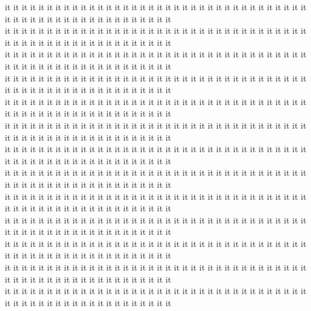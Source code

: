 it it it it it it it it it it it it it it it it it it it it it it it it it it it it it it it it it it it it it it it it it it it it it it it it it it it it it it it it\\
it it it it it it it it it it it it it it it it it it it it it it it it it it it it it it it it it it it it it it it it it it it it it it it it it it it it it it it it\\
it it it it it it it it it it it it it it it it it it it it it it it it it it it it it it it it it it it it it it it it it it it it it it it it it it it it it it it it\\
it it it it it it it it it it it it it it it it it it it it it it it it it it it it it it it it it it it it it it it it it it it it it it it it it it it it it it it it\\
it it it it it it it it it it it it it it it it it it it it it it it it it it it it it it it it it it it it it it it it it it it it it it it it it it it it it it it it\\
it it it it it it it it it it it it it it it it it it it it it it it it it it it it it it it it it it it it it it it it it it it it it it it it it it it it it it it it\\
it it it it it it it it it it it it it it it it it it it it it it it it it it it it it it it it it it it it it it it it it it it it it it it it it it it it it it it it\\
it it it it it it it it it it it it it it it it it it it it it it it it it it it it it it it it it it it it it it it it it it it it it it it it it it it it it it it it\\
it it it it it it it it it it it it it it it it it it it it it it it it it it it it it it it it it it it it it it it it it it it it it it it it it it it it it it it it\\
it it it it it it it it it it it it it it it it it it it it it it it it it it it it it it it it it it it it it it it it it it it it it it it it it it it it it it it it\\
it it it it it it it it it it it it it it it it it it it it it it it it it it it it it it it it it it it it it it it it it it it it it it it it it it it it it it it it\\
it it it it it it it it it it it it it it it it it it it it it it it it it it it it it it it it it it it it it it it it it it it it it it it it it it it it it it it it\\
it it it it it it it it it it it it it it it it it it it it it it it it it it it it it it it it it it it it it it it it it it it it it it it it it it it it it it it it\\
